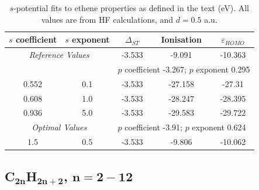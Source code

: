 \documentclass[journal=jctcce,manuscript=article]{achemso}
\begin{document}
\begin{table}[ht]
\caption{\(s\)-potential fits to ethene properties as defined in the text (eV). All values are from HF calculations, and \(d = 0.5\) a.u.}
\begin{tabular}{c c c c c}
\hline
\(s\) coefficient & \(s\) exponent & $\Delta_{ST}$  & Ionisation  & $\varepsilon_{HOMO}$  \\
\hline
\multicolumn{2}{c}{\textit{Reference Values}} & -3.533 & -9.091 & -10.363 \\
\hline
&& \multicolumn{3}{l}{\(p\) coefficient -3.267; \(p\) exponent 0.295} \\
\hline
0.552 & 0.1 & -3.533 & -27.158 & -27.31 \\
0.608 & 1.0 & -3.533 & -28.247 & -28.395 \\
0.936 & 5.0 & -3.533 & -29.583 & -29.722 \\
\hline
\multicolumn{2}{c}{\textit{Optimal Values}} &\multicolumn{3}{l}{\(p\) coefficient -3.91; \(p\) exponent 0.624} \\
\hline
1.5 & 0.5 & -3.533 & -9.806 & -10.062 \\
\hline
\end{tabular}
\label{table:ethene_excitations}
\end{table}

\subsection{C\(\mathbf{_{2n}}\)H\(\mathbf{_{2n+2}}\), \(\mathbf{n=2-12}\)}
\end{document}
